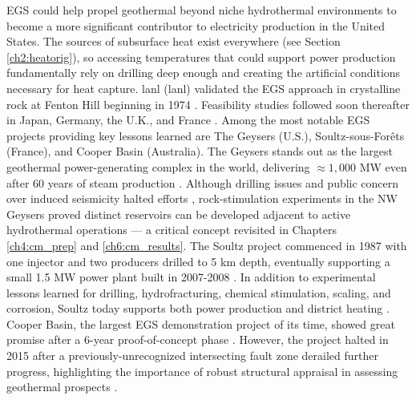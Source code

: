 EGS could help propel geothermal beyond niche hydrothermal environments to become a more significant contributor to electricity production in the United States. The sources of subsurface heat exist everywhere (see Section \ref{ch2:heatorig}), so accessing temperatures that could support power production fundamentally rely on drilling deep enough and creating the artificial conditions necessary for heat capture. \acrlong{lanl} (\acrshort{lanl}) validated the EGS approach in crystalline rock at Fenton Hill beginning in 1974 \citep{tester_future_2006}. Feasibility studies followed soon thereafter in Japan, Germany, the U.K., and France \citep{breede_systematic_2013}. Among the most notable EGS projects providing key lessons learned are The Geysers (U.S.), Soultz-sous-Forêts (France), and Cooper Basin (Australia). The Geysers stands out as the largest geothermal power-generating complex in the world, delivering $\approx1,000$ MW even after 60 years of steam production \citep{jelacic_evaluation_2008,williams_assessment_2008}. Although drilling issues and public concern over induced seismicity halted efforts \citep{larson_altarock_2009}, rock-stimulation experiments in the NW Geysers proved distinct reservoirs can be developed adjacent to active hydrothermal operations \citep{pan_establishment_2019} --- a critical concept revisited in Chapters \ref{ch4:cm_prep} and \ref{ch6:cm_results}. The Soultz project commenced in 1987 with one injector and two producers drilled to 5 km depth, eventually supporting a small 1.5 MW power plant built in 2007-2008 \citep[p.\ 463]{dipippo_geothermal_2012}. In addition to experimental lessons learned for drilling, hydrofracturing, chemical stimulation, scaling, and corrosion, Soultz today supports both power production and district heating \citep{durst_overview_2013}. Cooper Basin, the largest EGS demonstration project of its time, showed great promise after a 6-year proof-of-concept phase \citep{stephens_assessing_2010}. However, the project halted in 2015 after a previously-unrecognized intersecting fault zone derailed further progress, highlighting the importance of robust structural appraisal in assessing geothermal prospects \citep{holl_what_2015}. 


